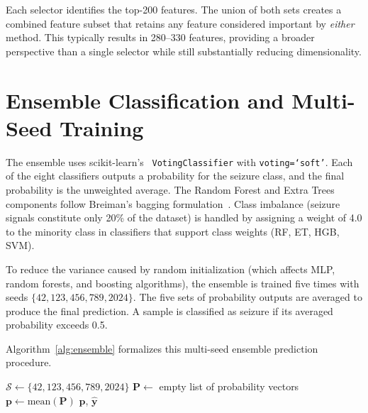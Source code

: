 Each selector identifies the top-200 features. The union of both sets creates a combined feature subset that retains any feature considered important by \textit{either} method. This typically results in 280--330 features, providing a broader perspective than a single selector while still substantially reducing dimensionality.

\section{Ensemble Classification and Multi-Seed Training}

The ensemble uses scikit-learn's~\citep{pedregosa2011scikit} \texttt{VotingClassifier} with \texttt{voting=`soft'}. Each of the eight classifiers outputs a probability for the seizure class, and the final probability is the unweighted average. The Random Forest and Extra Trees components follow Breiman's bagging formulation~\citep{breiman2001random}. Class imbalance (seizure signals constitute only 20\% of the dataset) is handled by assigning a weight of 4.0 to the minority class in classifiers that support class weights (RF, ET, HGB, SVM).

To reduce the variance caused by random initialization (which affects MLP, random forests, and boosting algorithms), the ensemble is trained five times with seeds $\{42, 123, 456, 789, 2024\}$. The five sets of probability outputs are averaged to produce the final prediction. A sample is classified as seizure if its averaged probability exceeds 0.5.

Algorithm~\ref{alg:ensemble} formalizes this multi-seed ensemble prediction procedure.

\begin{algorithm}[ht]
\caption{Multi-Seed Ensemble Prediction}
\label{alg:ensemble}
\SetAlgoLined
{}
\BlankLine
$\mathcal{S} \leftarrow \{42, 123, 456, 789, 2024\}$  
$\mathbf{P} \leftarrow$ empty list of probability vectors\;
\BlankLine
{}
\BlankLine
$\mathbf{p} \leftarrow \text{mean}(\mathbf{P})$ 
\BlankLine
{}
\BlankLine
\Return $\mathbf{p}$, $\hat{\mathbf{y}}$\;
\end{algorithm}

